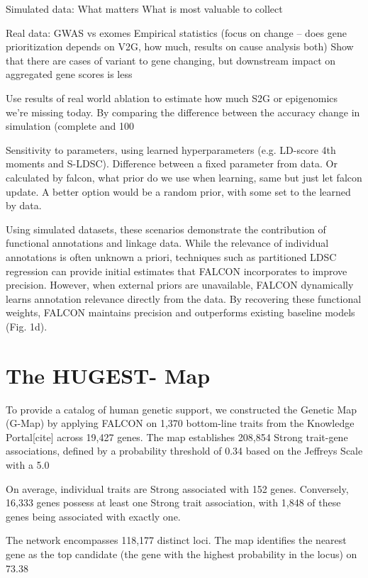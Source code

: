 Simulated data: What matters What is most valuable to collect

Real data: GWAS vs exomes Empirical statistics (focus on change – does gene prioritization depends on V2G, how much, results on cause analysis both) Show that there are cases of variant to gene changing, but downstream impact on aggregated gene scores is less

Use results of real world ablation to estimate how much S2G or epigenomics we’re missing today. By comparing the difference between the accuracy change in simulation (complete and 100%

Sensitivity to parameters, using learned hyperparameters (e.g. LD-score 4th moments and S-LDSC). Difference between a fixed parameter from data. Or calculated by falcon, what prior do we use when learning, same but just let falcon update. A better option would be a random prior, with some set to the learned by data.

Using simulated datasets, these scenarios demonstrate the contribution of functional annotations and linkage data. While the relevance of individual annotations is often unknown a priori, techniques such as partitioned LDSC regression can provide initial estimates that FALCON incorporates to improve precision. However, when external priors are unavailable, FALCON dynamically learns annotation relevance directly from the data. By recovering these functional weights, FALCON maintains precision and outperforms existing baseline models (Fig. 1d).
\section{The HUGEST- Map}
\label{sec:map}
To provide a catalog of human genetic support, we constructed the Genetic Map (G-Map) by applying FALCON on 1,370 bottom-line traits from the Knowledge Portal[cite] across 19,427 genes. The map establishes 208,854 Strong trait-gene associations, defined by a probability threshold of 0.34 based on the Jeffreys Scale with a 5.0%

On average, individual traits are Strong associated with 152 genes. Conversely, 16,333 genes possess at least one Strong trait association, with 1,848 of these genes being associated with exactly one.

The network encompasses 118,177 distinct loci. The map identifies the nearest gene as the top candidate (the gene with the highest probability in the locus) on 73.38%

